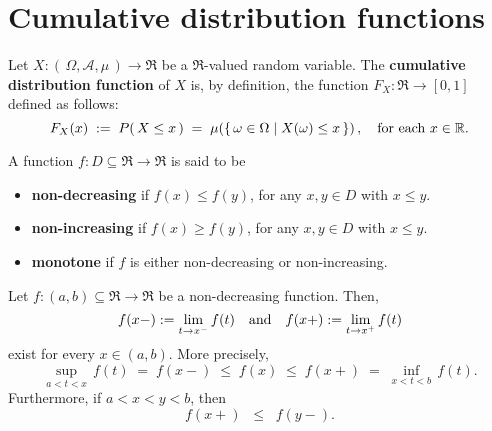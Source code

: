 

\section{Cumulative distribution functions}
\setcounter{theorem}{0}
\setcounter{equation}{0}

\begin{definition}\quad
Let $X : \left(\,\Omega,\mathcal{A},\mu\,\right) \longrightarrow \Re$ be a $\Re$-valued random variable.
The \textbf{cumulative distribution function} of $X$ is, by definition, the function
$F_{X} : \Re \longrightarrow [0,1]$ defined as follows:
\begin{equation*}
F_{X}(x) \; := \; P\!\left(\,X \leq x\,\right) \; = \; \mu\!\left(\left\{\,\omega \in \Omega \;\vert\; X(\omega) \leq x \,\right\}\right),
\quad
\textnormal{for each $x \in \Re$}.
\end{equation*}
\end{definition}

\begin{definition}\quad
A function $f : D \subseteq \Re \longrightarrow \Re$ is said to be 
\begin{itemize}
\item	\textbf{non-decreasing} if $f(x) \leq f(y)$, for any $x, y \in D$ with $x \leq y$.
\item	\textbf{non-increasing} if $f(x) \geq f(y)$, for any $x, y \in D$ with $x \leq y$.
\item	\textbf{monotone} if $f$ is either non-decreasing or non-increasing.
\end{itemize}
\end{definition}

\begin{theorem}\mbox{}\vskip 0.2cm
\noindent
Let $f : (a,b) \subseteq \Re \longrightarrow \Re$ be a non-decreasing function.
Then,
\begin{equation*}
f(x-) := \lim_{t \rightarrow x^{-}} f(t)
\quad\textnormal{and}\quad
f(x+) := \lim_{t \rightarrow x^{+}} f(t)
\end{equation*}
exist for every $x \in (a,b)$.
More precisely,
\begin{equation*}
\sup_{a < t < x}\,f(t)
\; = \; f(x-)
\;\leq\; f(x)
\;\leq\; f(x+)
\;=\; \inf_{x < t < b}\,f(t).
\end{equation*}
Furthermore, if $a < x < y < b$, then
\begin{equation*}
f(x+) \;\;\leq\;\; f(y-).
\end{equation*}
\end{theorem}


